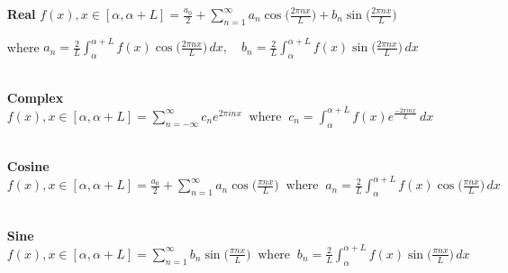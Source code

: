 \documentclass[11pt]{memoir}
\begin{document}
  \begin{enumerate}
    \item[\textbf{Real  }]
      \displaystyle\(f(x), x \in [\alpha, \alpha + L] = \frac{a_0}{2} + \sum_{n=1}^{\infty}
      a_n \cos\bigg(\frac{2 \pi n x}{L}\bigg) + b_n \sin\bigg(\frac{2 \pi n x}{L}\bigg)\)

      where \displaystyle\(a_n = \frac{2}{L}\int_{\alpha}^{\alpha+L}f(x)\cos\bigg(\frac{2 \pi n x}{L}\bigg) \,dx,
      \quad b_n = \frac{2}{L}\int_{\alpha}^{\alpha+L}f(x)\sin\bigg(\frac{2 \pi n x}{L}\bigg) \,dx\) \\\\

    \item[\textbf{Complex  }]
      \displaystyle\(f(x), x \in [\alpha, \alpha + L] = \sum_{n=-\infty}^{\infty}
      c_n e^{2 \pi inx} \;\;\text{where}\;\; c_n = \int_{\alpha}^{\alpha+L}f(x) e^{\frac{-2\pi inx}{L}} \,dx\) \\\\

    \item[\textbf{Cosine}]
      \displaystyle\(f(x), x \in [\alpha, \alpha + L] = \frac{a_0}{2} + \sum_{n=1}^{\infty}
      a_n \cos\bigg(\frac{ \pi n x}{L}\bigg) \;\;\text{where}\;\; 
      a_n = \frac{2}{L}\int_{\alpha}^{\alpha+L}f(x)\cos\bigg(\frac{\pi nx}{L}\bigg) \,dx\) \\\\

    \item[\textbf{Sine}]
      \displaystyle\(f(x), x \in [\alpha, \alpha + L] = \sum_{n=1}^{\infty}
      b_n \sin\bigg(\frac{ \pi n x}{L}\bigg) \;\;\text{where}\;\; 
      b_n = \frac{2}{L}\int_{\alpha}^{\alpha+L}f(x)\sin\bigg(\frac{\pi nx}{L}\bigg) \,dx\)
  \end{enumerate}
\end{document}
